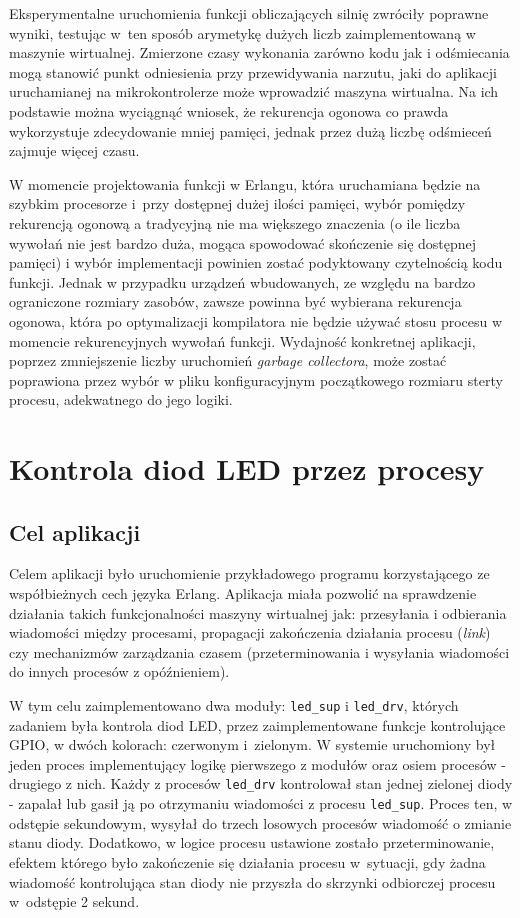 Eksperymentalne uruchomienia funkcji obliczających silnię zwróciły poprawne wyniki, testując w~ten sposób arymetykę dużych liczb zaimplementowaną w maszynie wirtualnej.
Zmierzone czasy wykonania zarówno kodu jak i odśmiecania mogą stanowić punkt odniesienia przy przewidywania narzutu, jaki do aplikacji uruchamianej na mikrokontrolerze może wprowadzić maszyna wirtualna.
Na ich podstawie można wyciągnąć wniosek, że rekurencja ogonowa co prawda wykorzystuje zdecydowanie mniej pamięci, jednak przez dużą liczbę odśmieceń zajmuje więcej czasu. 

W momencie projektowania funkcji w Erlangu, która uruchamiana będzie na szybkim procesorze i~przy dostępnej dużej ilości pamięci, wybór pomiędzy rekurencją ogonową a tradycyjną nie ma większego znaczenia (o ile liczba wywołań nie jest bardzo duża, mogąca spowodować skończenie się dostępnej pamięci) i wybór implementacji powinien zostać podyktowany czytelnością kodu funkcji. Jednak w przypadku urządzeń wbudowanych, ze względu na bardzo ograniczone rozmiary zasobów, zawsze powinna być wybierana rekurencja ogonowa, która po optymalizacji kompilatora nie będzie używać stosu procesu w momencie rekurencyjnych wywołań funkcji.
Wydajność konkretnej aplikacji, poprzez zmniejszenie liczby uruchomień \emph{garbage collectora}, może zostać poprawiona przez wybór w pliku konfiguracyjnym początkowego rozmiaru sterty procesu, adekwatnego do jego logiki.


\section{Kontrola diod LED przez procesy}
\label{sec:przykladyDiody}

\subsection{Cel aplikacji}

Celem aplikacji było uruchomienie przykładowego programu korzystającego ze współbieżnych cech języka Erlang.
Aplikacja miała pozwolić na sprawdzenie działania takich funkcjonalności maszyny wirtualnej jak:
przesyłania i odbierania wiadomości między procesami, propagacji zakończenia działania procesu (\emph{link}) czy mechanizmów zarządzania czasem (przeterminowania i wysyłania wiadomości do innych procesów z opóźnieniem).

W tym celu zaimplementowano dwa moduły: \texttt{led\_sup} i \texttt{led\_drv}, których zadaniem była kontrola diod LED, przez zaimplementowane funkcje kontrolujące GPIO, w dwóch kolorach: czerwonym i~zielonym.
W systemie uruchomiony był jeden proces implementujący logikę pierwszego z modułów oraz osiem procesów - drugiego z nich.
Każdy z procesów \texttt{led\_drv} kontrolował stan jednej zielonej diody - zapalał lub gasił ją po otrzymaniu wiadomości z procesu \texttt{led\_sup}. Proces ten, w odstępie sekundowym, wysyłał do trzech losowych procesów wiadomość o zmianie stanu diody. Dodatkowo, w logice procesu ustawione zostało przeterminowanie, efektem którego było zakończenie się działania procesu w~sytuacji, gdy żadna wiadomość kontrolująca stan diody nie przyszła do skrzynki odbiorczej procesu w~odstępie 2 sekund.

